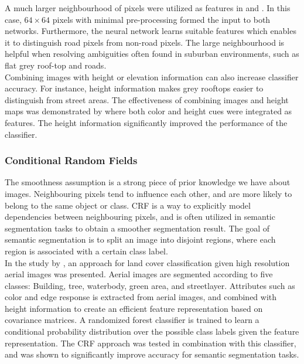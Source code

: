 A much larger neighbourhood of pixels were utilized as features in \citep{Mnih_aerial_images_noisy} and \citep{Mnih_roads_high_res_aerial_images}. In this case, $64 \times 64$ pixels with minimal pre-processing formed the input to both  networks. Furthermore, the neural network learns suitable features which enables it to distinguish road pixels from non-road pixels. The large neighbourhood is helpful when resolving ambiguities often found in suburban environments, such as flat grey roof-top and roads. \\

  Combining images with height or elevation information can also increase classifier accuracy. For instance, height information makes grey rooftops easier to distinguish from street areas. The effectiveness of combining images and height maps was demonstrated by \cite{Kluckner_semantic_height} where both color and height cues were integrated as features. The height information significantly improved the performance of the classifier.
  

\subsubsection{Conditional Random Fields}
The smoothness assumption is a strong piece of prior knowledge we have about images. Neighbouring pixels tend to influence each other, and are more likely to belong to the same object or class. \ac{CRF} is a way to explicitly model dependencies between neighbouring pixels, and is often utilized in semantic segmentation tasks to obtain a smoother segmentation result. The goal of semantic segmentation is to split an image into disjoint regions, where each region is associated with a certain class label.\\

In the study by \cite{Kluckner_semantic_height}, an approach for land cover classification given high resolution aerial images was presented. Aerial images are segmented according to five classes: Building, tree, waterbody, green area, and streetlayer. Attributes such as color and edge response is extracted from aerial images, and combined with height information to create an efficient feature representation based on covariance matrices. A randomized forest classifier is trained to learn a conditional probability distribution over the possible class labels given the feature representation. The \ac{CRF} approach was tested in combination with this classifier, and was shown to significantly improve accuracy for semantic segmentation tasks. \\ 

